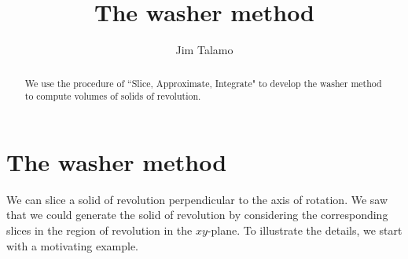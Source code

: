 \documentclass{ximera}
\author{Jim Talamo}
\title[Dig-In:]{The washer method}
\begin{document}
\begin{abstract}
We use the procedure of ``Slice, Approximate, Integrate" to develop the washer method to compute volumes of solids of revolution.
\end{abstract}
\maketitle


\section{The washer method}

We can slice a solid of revolution perpendicular to the axis of rotation.  We saw that we could generate the solid of revolution by considering the corresponding slices in the region of revolution in the $xy$-plane.  To illustrate the details, we start with a motivating example.  
\end{document}
